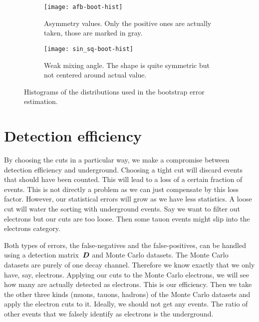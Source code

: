 \documentclass[11pt, english, fleqn, DIV=15, headinclude, BCOR=2cm]{scrreprt}
\begin{document}
\begin{figure}
    \centering
    \begin{subfigure}[t]{0.48\linewidth}
        \centering
        \texttt{[image: afb-boot-hist]}
        \caption{%
            Asymmetry values. Only the positive ones are actually taken, those
            are marked in gray.
        }
        \label{fig:afb-boot-hist}
    \end{subfigure}
    \hfill
    \begin{subfigure}[t]{0.48\linewidth}
        \centering
        \texttt{[image: sin\_sq-boot-hist]}
        \caption{%
            Weak mixing angle. The shape is quite symmetric but not centered
            around actual value.
        }
        \label{fig:sin_sq-boot-hist}
    \end{subfigure}
    \caption{%
        Histograms of the distributions used in the bootstrap error estimation.
    }
    \label{fig:boot-hist}
\end{figure}

\section{Detection efficiency}
\label{sec:detection-efficiency}

By choosing the cuts in a particular way, we make a compromise between
detection efficiency and underground. Choosing a tight cut will discard events
that should have been counted. This will lead to a loss of a certain fraction
of events. This is not directly a problem as we can just compensate by this
loss factor. However, our statistical errors will grow as we have less
statistics. A loose cut will water the sorting with underground events. Say we
want to filter out electrons but our cuts are too loose. Then some tauon events
might slip into the electrons category.

Both types of errors, the false-negatives and the false-positives, can be
handled using a detection matrix~$\mat D$ and Monte Carlo datasets.
The Monte Carlo datasets are purely of one decay channel. Therefore we know
exactly that we only have, say, electrons. Applying our cuts to the Monte Carlo
electrons, we will see how many are actually detected as electrons. This is our
efficiency. Then we take the other three kinds (muons, tauons, hadrons) of the
Monte Carlo datasets and apply the electron cuts to it. Ideally, we should not
get any events. The ratio of other events that we falsely identify as electrons
is the underground.
\end{document}
